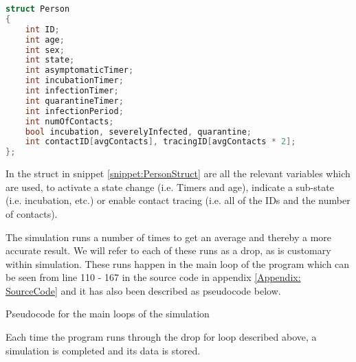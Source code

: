 \begin{lstlisting}[language=c, caption={Person Struct}, captionpos=b, label={snippet:PersonStruct}]
struct Person
{
    int ID;
    int age;
    int sex;
    int state;
    int asymptomaticTimer; 
    int incubationTimer;
    int infectionTimer;
    int quarantineTimer;
    int infectionPeriod;
    int numOfContacts;
    bool incubation, severelyInfected, quarantine;
    int contactID[avgContacts], tracingID[avgContacts * 2];
};
\end{lstlisting}

In the struct in snippet \ref{snippet:PersonStruct} are all the relevant variables which are used, to activate a state change (i.e. Timers and age), indicate a sub-state (i.e. incubation, etc.) or enable contact tracing (i.e. all of the IDs and the number of contacts).

The simulation runs a number of times to get an average and thereby a more accurate result. We will refer to each of these runs as a drop, as is customary within simulation. These runs happen in the main loop of the program which can be seen from line 110 - 167 in the source code in appendix \vref{Appendix: SourceCode} and it has also been described as pseudocode below. \\

\begin{algorithm}[H]
    \caption{Pseudocode for the main loops of the simulation \label{pseudo: main loop}}
\end{algorithm}
Each time the program runs through the drop for loop described above, a simulation is completed and its data is stored.

